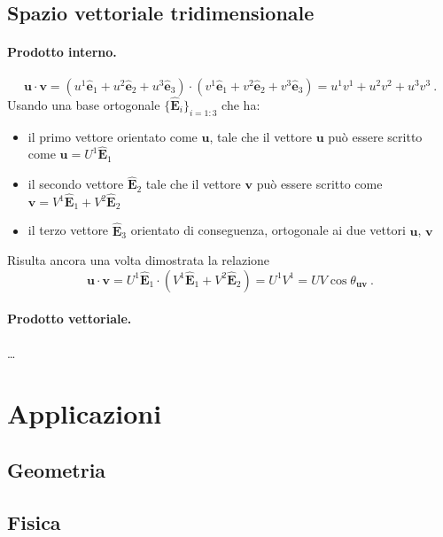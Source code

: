 \subsection{Spazio vettoriale tridimensionale}

\paragraph{Prodotto interno.}
\begin{equation}
    \mathbf{u} \cdot \mathbf{v} =
    ( u^1 \mathbf{\hat{e}}_1 + u^2 \mathbf{\hat{e}}_2 + u^3 \mathbf{\hat{e}}_3) \cdot ( v^1 \mathbf{\hat{e}}_1 + v^2 \mathbf{\hat{e}}_2 + v^3 \mathbf{\hat{e}}_3) = u^1 v^1 + u^2 v^2 + u^3 v^3 \ . 
\end{equation}
Usando una base ortogonale $\{ \mathbf{\hat{E}}_i \}_{i=1:3}$ che ha:
\begin{itemize}
    \item il primo vettore orientato come $\mathbf{u}$, tale che il vettore $\mathbf{u}$ può essere scritto come $\mathbf{u} = U^1 \mathbf{\hat{E}}_1$
    \item il secondo vettore $\mathbf{\hat{E}}_2$ tale che il vettore $\mathbf{v}$ può essere scritto come $\mathbf{v} = V^1 \mathbf{\hat{E}}_1 + V^2 \mathbf{\hat{E}}_2$
    \item il terzo vettore $\mathbf{\hat{E}}_3$ orientato di conseguenza, ortogonale ai due vettori $\mathbf{u}$, $\mathbf{v}$
\end{itemize}
Risulta ancora una volta dimostrata la relazione
\begin{equation}
    \mathbf{u} \cdot \mathbf{v} =
      U^1 \mathbf{\hat{E}}_1 \cdot ( V^1 \mathbf{\hat{E}}_1 + V^2 \mathbf{\hat{E}}_2) = U^1 V^1 = U V \cos \theta_{\mathbf{u} \mathbf{v}} \ . 
\end{equation}

\paragraph{Prodotto vettoriale.}
{\color{red} \dots}

\section{Applicazioni}
\subsection{Geometria}
\subsection{Fisica}

